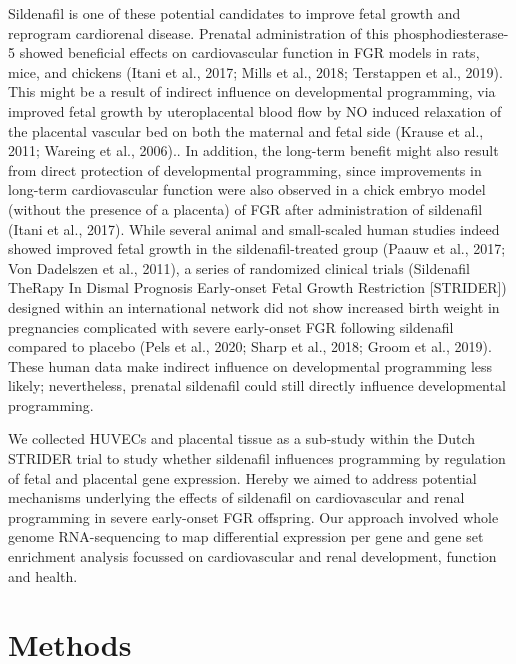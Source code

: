 \documentclass[authordate, empirical,issue]{jote-new-article}
\begin{document}
Sildenafil is one of these potential candidates to improve fetal growth and reprogram cardiorenal disease. Prenatal administration of this phosphodiesterase-5 showed beneficial effects on cardiovascular function in FGR models in rats, mice, and chickens (Itani et al., 2017; Mills et al., 2018; Terstappen et al., 2019). This might be a result of indirect influence on developmental programming, via improved fetal growth by uteroplacental blood flow by NO induced relaxation of the placental vascular bed on both the maternal and fetal side (Krause et al., 2011; Wareing et al., 2006).. In addition, the long-term benefit might also result from direct protection of developmental programming, since improvements in long-term cardiovascular function were also observed in a chick embryo model (without the presence of a placenta) of FGR after administration of sildenafil (Itani et al., 2017). While several animal and small-scaled human studies indeed showed improved fetal growth in the sildenafil-treated group (Paauw et al., 2017; Von Dadelszen et al., 2011), a series of randomized clinical trials (Sildenafil TheRapy In Dismal Prognosis Early-onset Fetal Growth Restriction [STRIDER]) designed within an international network did not show increased birth weight in pregnancies complicated with severe early-onset FGR following sildenafil compared to placebo (Pels et al., 2020; Sharp et al., 2018; Groom et al., 2019). These human data make indirect influence on developmental programming less likely; nevertheless, prenatal sildenafil could still directly influence developmental programming.



We collected HUVECs and placental tissue as a sub-study within the Dutch STRIDER trial to study whether sildenafil influences programming by regulation of fetal and placental gene expression. Hereby we aimed to address potential mechanisms underlying the effects of sildenafil on cardiovascular and renal programming in severe early-onset FGR offspring. Our approach involved whole genome RNA-sequencing to map differential expression per gene and gene set enrichment analysis focussed on cardiovascular and renal development, function and health.







\section{Methods}
\end{document}
